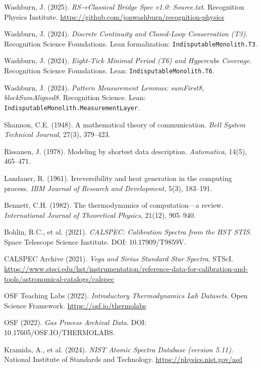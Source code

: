 \documentclass[11pt,letterpaper]{article}
\theoremstyle{definition}
\theoremstyle{remark}
\begin{document}
\begin{thebibliography}{99}

Washburn, J. (2025). \emph{RS→Classical Bridge Spec v1.0: Source.txt}. Recognition Physics Institute. \url{https://github.com/jonwashburn/recognition-physics}

Washburn, J. (2024). \emph{Discrete Continuity and Closed-Loop Conservation (T3)}. Recognition Science Foundations. Lean formalization: \texttt{IndisputableMonolith.T3}.

Washburn, J. (2024). \emph{Eight-Tick Minimal Period (T6) and Hypercube Coverage}. Recognition Science Foundations. Lean: \texttt{IndisputableMonolith.T6}.

Washburn, J. (2024). \emph{Pattern Measurement Lemmas: sumFirst8, blockSumAligned8}. Recognition Science. Lean: \texttt{IndisputableMonolith.MeasurementLayer}.

Shannon, C.E. (1948). A mathematical theory of communication. \emph{Bell System Technical Journal}, 27(3), 379--423.

Rissanen, J. (1978). Modeling by shortest data description. \emph{Automatica}, 14(5), 465--471.

Landauer, R. (1961). Irreversibility and heat generation in the computing process. \emph{IBM Journal of Research and Development}, 5(3), 183--191.

Bennett, C.H. (1982). The thermodynamics of computation---a review. \emph{International Journal of Theoretical Physics}, 21(12), 905--940.

Bohlin, R.C., et al. (2021). \emph{CALSPEC: Calibration Spectra from the HST STIS}. Space Telescope Science Institute. DOI: 10.17909/T9859V.

CALSPEC Archive (2021). \emph{Vega and Sirius Standard Star Spectra}. STScI. \url{https://www.stsci.edu/hst/instrumentation/reference-data-for-calibration-and-tools/astronomical-catalogs/calspec}

OSF Teaching Labs (2022). \emph{Introductory Thermodynamics Lab Datasets}. Open Science Framework. \url{https://osf.io/thermolabs}

OSF (2022). \emph{Gas Process Archival Data}. DOI: 10.17605/OSF.IO/THERMOLABS.

Kramida, A., et al. (2024). \emph{NIST Atomic Spectra Database (version 5.11)}. National Institute of Standards and Technology. \url{https://physics.nist.gov/asd}


\end{thebibliography}
\end{document}

